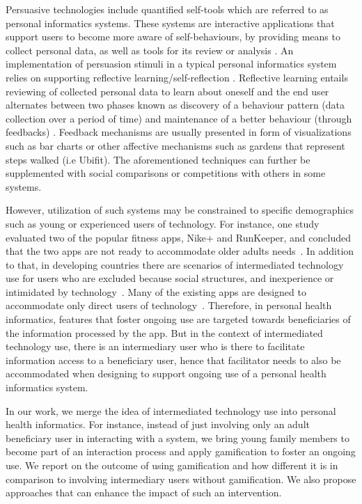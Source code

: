 \documentclass{sig-alternate}
\begin{document}
Persuasive technologies include quantified self-tools which are referred to as personal informatics systems. These systems are interactive applications that support users to become more aware of self-behaviours, by providing means to collect personal data, as well as tools for its review or analysis \cite{li2011:personal,li2012:personal}. An implementation of persuasion stimuli in a typical personal informatics system relies on supporting reflective learning/self-reflection \cite{li2011:understanding}. Reflective learning entails reviewing of collected personal data to learn about oneself and the end user alternates between two phases known as discovery of a behaviour pattern (data collection over a period of time) and maintenance of a better behaviour (through feedbacks) \cite{li2011:understanding}. Feedback mechanisms are usually presented in form of visualizations such as bar charts or other affective mechanisms such as gardens that represent steps walked (i.e Ubifit\cite{klasnja2009:using}). The aforementioned techniques can further be supplemented with social comparisons\cite{Oinas-kukkonen:psd} or competitions with others\cite{comber2013:designing} in some systems.

However, utilization of such systems may be constrained to specific demographics such as young or experienced users of technology. For instance, one study evaluated two of the popular fitness apps, Nike+ and RunKeeper, and concluded that the two apps are not ready to accommodate older adults needs~\cite{silva2014:smartphones}. In addition to that, in developing countries there are scenarios of intermediated technology use for users who are excluded because social structures, and  inexperience or intimidated by technology~\cite{sambasivan2010,kumar2015mobile}. Many of the existing apps are designed to accommodate only direct users of technology~\cite{sambasivan2010}. Therefore, in personal health informatics, features that foster ongoing use are targeted towards beneficiaries of the information processed by the app. But in the context of intermediated technology use, there is an intermediary user who is there to facilitate information access to a beneficiary user, hence that facilitator needs to also be accommodated when designing to support ongoing use of a personal health informatics system.

In our work, we merge the idea of intermediated technology use into personal health informatics. For instance, instead of just involving only an adult beneficiary user in interacting with a system, we bring young family members to become part of an interaction process and apply gamification to foster an ongoing use. We report on the outcome of using gamification and how different it is in comparison to involving intermediary users without gamification. We also propose approaches that can enhance the impact of such an intervention. 
\end{document}
